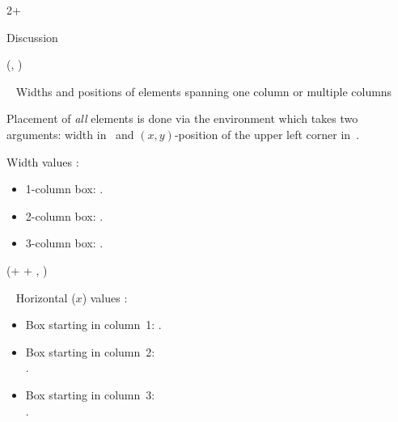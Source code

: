 \documentclass{beamer}
\newlength{\blockFour}
\begin{document}
\begin{frame}[t]
\begin{textblock*}{2\colwidth + \colsep}
\begin{parblock}{Discussion}
\end{parblock}

\end{textblock*}




\begin{textblock*}{\colwidth}(\leftmargin, \blockFour)

\begin{parblock}{~}  %
	\alert{Widths and positions of elements spanning one column or multiple columns}\vspace{0.333333\baselineskip}

	\noindent Placement of \emph{all} elements is done via the  environment which takes two arguments: width in~\code{\{\}} and $(x, y)$-position of the upper left corner in~\code{()}.

	\vspace{0.666667\baselineskip}\noindent%
	\alert{Width values} :
	\begin{itemize}
		\setlength{\itemsep}{0pt}
		\item 1-column box: .
		\item 2-column box: .
		\item 3-column box: .
	\end{itemize}

\end{parblock}

\end{textblock*}




\begin{textblock*}{\colwidth}(\leftmargin + \colwidth + \colsep, \blockFour)

\begin{parblock}{~}
	\alert{Horizontal ($x$) values} :
	\begin{itemize}
		\setlength{\itemsep}{0pt}
		\item Box starting in column~1: .
		\item Box starting in column~2: \\
			.
		\item Box starting in column~3: \\
			.
	\end{itemize}


\end{parblock}
\end{textblock*}
\end{frame}
\end{document}
